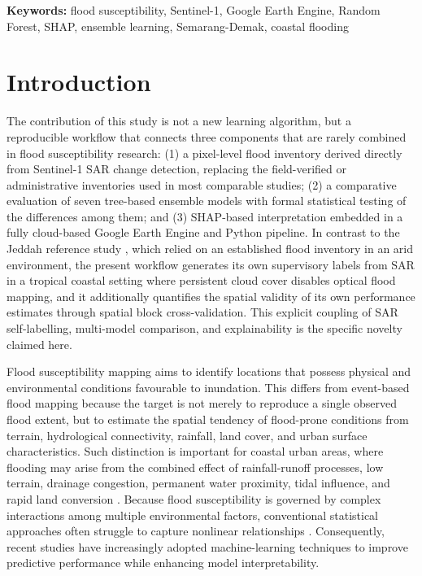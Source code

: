 \documentclass[11pt,twoside]{article}
\newcommand{\SMDSKeywords}[1]{
\vspace{0.5em}
\noindent\textbf{Keywords:} #1
}
\begin{document}
\SMDSKeywords{flood susceptibility, Sentinel-1, Google Earth Engine, Random
Forest, SHAP, ensemble learning, Semarang-Demak, coastal flooding}
 
\section{Introduction}\label{introduction}

The contribution of this study is not a new learning algorithm, but a
reproducible workflow that connects three components that are rarely combined
in flood susceptibility research: (1) a pixel-level flood inventory derived
directly from Sentinel-1 SAR change detection, replacing the field-verified or
administrative inventories used in most comparable studies; (2) a comparative
evaluation of seven tree-based ensemble models with formal statistical testing
of the differences among them; and (3) SHAP-based interpretation embedded in a
fully cloud-based Google Earth Engine and Python pipeline. In contrast to the
Jeddah reference study \cite{jeddah2025}, which relied on an established flood
inventory in an arid environment, the present workflow generates its own
supervisory labels from SAR in a tropical coastal setting where persistent
cloud cover disables optical flood mapping, and it additionally quantifies the
spatial validity of its own performance estimates through spatial block
cross-validation. This explicit coupling of SAR self-labelling, multi-model
comparison, and explainability is the specific novelty claimed here.

Flood susceptibility mapping aims to identify locations that possess physical
and environmental conditions favourable to inundation. This differs from
event-based flood mapping because the target is not merely to reproduce a single
observed flood extent, but to estimate the spatial tendency of flood-prone
conditions from terrain, hydrological connectivity, rainfall, land cover, and
urban surface characteristics. Such distinction is important for coastal urban
areas, where flooding may arise from the combined effect of rainfall-runoff
processes, low terrain, drainage congestion, permanent water proximity, tidal
influence, and rapid land conversion \cite{Kaur2026}. Because flood susceptibility is governed by complex interactions among multiple environmental factors, conventional statistical approaches often struggle to capture nonlinear relationships \cite{Tique2026}. Consequently, recent studies have increasingly adopted machine-learning techniques to improve predictive performance while enhancing model interpretability.
 
\end{document}
